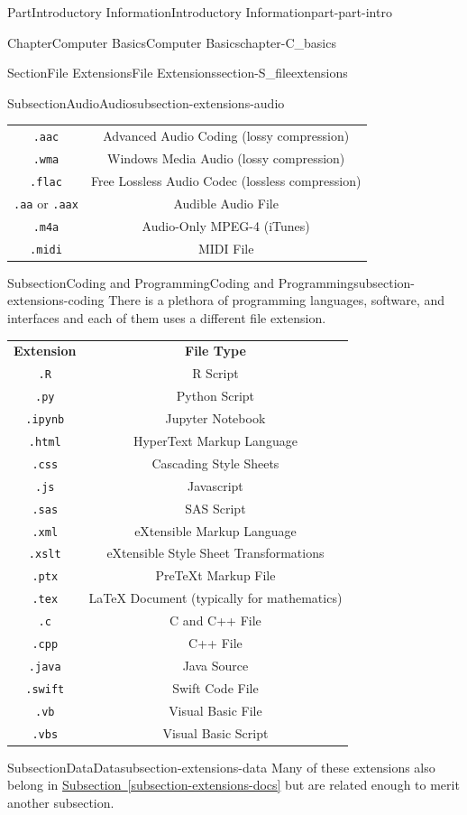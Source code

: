 \documentclass[oneside,10pt,]{book}
\newcommand{\tabularfont}{\relax}
\newcommand{\xreffont}{\relax}
\newcommand{\mono}[1]{\texttt{#1}}
\begin{document}
\begin{partptx}{Part}{Introductory Information}{}{Introductory Information}{}{}{part-part-intro}
\begin{chapterptx}{Chapter}{Computer Basics}{}{Computer Basics}{}{}{chapter-C_basics}
\begin{sectionptx}{Section}{File Extensions}{}{File Extensions}{}{}{section-S_fileextensions}
\begin{subsectionptx}{Subsection}{Audio}{}{Audio}{}{}{subsection-extensions-audio}
\begin{center}
{\begin{tabular}{cc}
\mono{.aac}&Advanced Audio Coding (lossy compression)\tabularnewline[0pt]
\mono{.wma}&Windows Media Audio (lossy compression)\tabularnewline[0pt]
\mono{.flac}&Free Lossless Audio Codec (lossless compression)\tabularnewline[0pt]
\mono{.aa} or \mono{.aax}&Audible Audio File\tabularnewline[0pt]
\mono{.m4a}&Audio-Only MPEG-4 (iTunes)\tabularnewline[0pt]
\mono{.midi}&MIDI File
\end{tabular}
}%
\end{center}%
\end{subsectionptx}
%
%
\typeout{************************************************}
\typeout{************************************************}
%
\begin{subsectionptx}{Subsection}{Coding and Programming}{}{Coding and Programming}{}{}{subsection-extensions-coding}
%
There is a plethora of programming languages, software, and interfaces and each of them uses a different file extension.%
\begin{center}%
{\tabularfont%
\begin{tabular}{cc}
{\bfseries{}Extension}&{\bfseries{}File Type}\tabularnewline[0pt]
\mono{.R}&R Script\tabularnewline[0pt]
\mono{.py}&Python Script\tabularnewline[0pt]
\mono{.ipynb}&Jupyter Notebook\tabularnewline[0pt]
\mono{.html}&HyperText Markup Language\tabularnewline[0pt]
\mono{.css}&Cascading Style Sheets\tabularnewline[0pt]
\mono{.js}&Javascript\tabularnewline[0pt]
\mono{.sas}&SAS Script\tabularnewline[0pt]
\mono{.xml}&eXtensible Markup Language\tabularnewline[0pt]
\mono{.xslt}&eXtensible Style Sheet Transformations\tabularnewline[0pt]
\mono{.ptx}&PreTeXt Markup File\tabularnewline[0pt]
\mono{.tex}&LaTeX Document (typically for mathematics)\tabularnewline[0pt]
\mono{.c}&C and C++ File\tabularnewline[0pt]
\mono{.cpp}&C++ File\tabularnewline[0pt]
\mono{.java}&Java Source\tabularnewline[0pt]
\mono{.swift}&Swift Code File\tabularnewline[0pt]
\mono{.vb}&Visual Basic File\tabularnewline[0pt]
\mono{.vbs}&Visual Basic Script
\end{tabular}
}%
\end{center}%
\end{subsectionptx}
%
%
\typeout{************************************************}
\typeout{************************************************}
%
\begin{subsectionptx}{Subsection}{Data}{}{Data}{}{}{subsection-extensions-data}
%
Many of these extensions also belong in \hyperref[subsection-extensions-docs]{Subsection~{\xreffont\ref{subsection-extensions-docs}}} but are related enough to merit another subsection.%

\end{subsectionptx}
\end{sectionptx}
\end{chapterptx}
\end{partptx}
\end{document}
